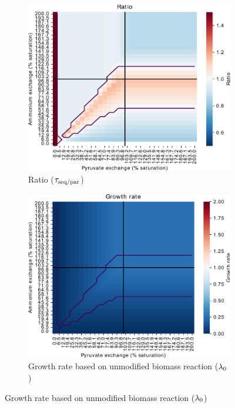 \begin{figure}
  \centering
  \begin{subfigure}[t]{0.45\textwidth}
  \centering
    \includegraphics[width=\linewidth]{ec_grid_pyr_amm_ratio}
    \caption{
      Ratio ($\tau_{\mathrm{seq}/\mathrm{par}}$)
    }
    \label{fig:model-grid-pyr-ratio}
  \end{subfigure}%
  \begin{subfigure}[t]{0.45\textwidth}
  \centering
    \includegraphics[width=\linewidth]{ec_grid_pyr_amm_growthrate}
    \caption{
      Growth rate based on unmodified biomass reaction ($\lambda_{0}$)
    }
    \label{fig:model-grid-pyr-growthrate}
  \end{subfigure}


\end{figure}

